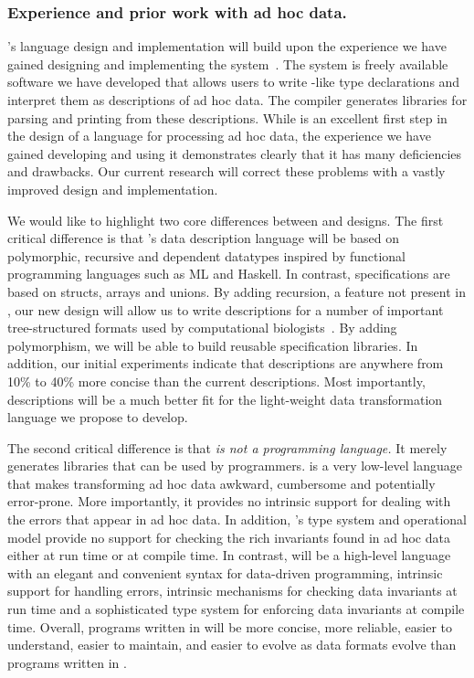\documentclass[11pt]{article}
\begin{document}
\subsubsection{Experience and prior work with ad hoc data.}
\datatype's language design and implementation will build upon the experience
we have gained designing and implementing the \pads{}
system~\cite{fisher+:pads,pads-website}.  The \pads{} system 
is freely available software we have developed that allows
users to write \C-like type declarations and interpret them as
descriptions of ad hoc data.  The \pads{} compiler generates libraries
for parsing and printing from these descriptions.  
While \pads{} is an excellent first step in the design of
a language for processing ad hoc data, the experience we have
gained developing and using it demonstrates clearly that 
it has many deficiencies and drawbacks.  Our current research 
will correct these problems with a vastly improved
design and implementation.

We would like to highlight two core differences between \pads{} and 
\datatype{} designs.  The first critical difference is that 
\datatype's data description language will be based on
polymorphic, recursive and dependent datatypes inspired by
functional programming languages such as ML and Haskell.  In contrast,
\pads{} specifications are based on \C{} structs, arrays
and unions.  By adding recursion, a feature not present in
\pads, our new design will allow us to write descriptions for a
number of important tree-structured formats used by computational 
biologists~\cite{geneontology,newick}.  
By adding polymorphism, we will be able to build reusable specification
libraries.  In addition, our initial
experiments indicate that \datatype{} descriptions are anywhere from
10\% to 40\% more concise than the current \pads{} descriptions.  Most
importantly, \datatype{} descriptions will be a much better fit for the
light-weight data transformation language we propose to develop.  

The second critical difference is that {\em \pads{} is not a programming
language.}  It merely generates libraries that can be used by \C{}
programmers.  \C{} is a very low-level language that makes
transforming ad hoc data awkward, cumbersome and potentially
error-prone.  More importantly, it provides no intrinsic support for
dealing with the errors that appear in ad hoc data.  In addition, \C's
type system and operational model provide no support for checking the
rich invariants found in ad hoc data either at run time or at compile
time.  In contrast, \datatype{} will be a high-level language with an
elegant and convenient syntax for data-driven programming, intrinsic
support for handling errors, intrinsic mechanisms for checking data
invariants at run time and a sophisticated type system for enforcing
data invariants at compile time.  Overall,
programs written in \datatype{} will be more concise, more reliable,
easier to understand,
easier to maintain, and easier to evolve as data formats evolve
than programs written in \C.
\end{document}
